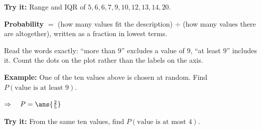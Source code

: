 \documentclass[12pt]{article}
\begin{document}
\begin{tryitbox}
\textbf{Try it:} \quad Range and IQR of $5, 6, 6, 7, 9, 10, 12, 13, 14, 20$.\\[2pt]
\end{tryitbox}


\begin{formulabox}
\textbf{Probability} $=$ (how many values fit the description) $\div$ (how many values
there are altogether), written as a fraction in lowest terms.\par
\smallskip
Read the words exactly: ``more than $9$'' excludes a value of $9$, ``at least $9$'' includes
it. Count the dots on the plot rather than the labels on the axis.
\end{formulabox}

\begin{examplebox}
\textbf{Example:} \quad One of the ten values above is chosen at random. Find
$P(\text{value is at least } 9)$.

$\Rightarrow\quad P = \ans{\tfrac{2}{5}}$
\end{examplebox}

\begin{tryitbox}
\textbf{Try it:} \quad From the same ten values, find $P(\text{value is at most } 4)$.\\[2pt]
\end{tryitbox}
\end{document}

